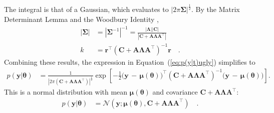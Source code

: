 \documentclass[modern]{rnaastex}
\renewcommand{\eqref}[1]{\ref{eq:#1}}
\newcommand{\Eq}[1]{Equation~(\eqref{#1})}
\newcommand{\eq}[1]{\Eq{#1}}
\newcommand{\eqlabel}[1]{\label{eq:#1}}
\newcommand{\bvec}[1]{{\ensuremath{\boldsymbol{#1}}}}
\newcommand{\Normal}{\ensuremath{\mathcal{N}}}
\newcommand{\mA}{\ensuremath{\bvec{A}}}
\newcommand{\mC}{\ensuremath{\bvec{C}}}
\newcommand{\mS}{\ensuremath{\bvec{\Sigma}}}
\newcommand{\mL}{\ensuremath{\bvec{\Lambda}}}
\newcommand{\vy}{\ensuremath{\bvec{y}}}
\newcommand{\vt}{\ensuremath{\bvec{\theta}}}
\newcommand{\vm}{\ensuremath{\bvec{\mu}(\bvec{\theta})}}
\newcommand{\vre}{\ensuremath{\bvec{r}}}
\begin{document}
%
The integral is that of a Gaussian, which evaluates to
$|2\pi\bvec{\Sigma}|^\frac{1}{2}$.
By the Matrix Determinant Lemma and the Woodbury Identity
\citep[for example,][]{Woodbury:1950, Harville:1997},
%
\begin{align}
|\mS| &= {|\mS^{-1}|}^{-1} = \frac{|\mL| |\mC|}{|\mC + \mA \mL \mA^\top|} \nonumber \\
k &= \vre^\top \left( \mC + \mA \mL \mA^\top \right)^{-1} \vre \quad.
\end{align}
%
Combining these results, the expression in \eq{p(y|t)ugly} simplifies to
\begin{align}
\eqlabel{p(y|t)exp}
p(\vy | \vt) &= \frac{1}{
                |2\pi(\mC {+} \mA \mL \mA^\top)|^\frac{1}{2}}
                \exp \left[ {-}\frac{1}{2} \big( \vy\,{-}\,\vm \big)^\top
                            (\mC {+} \mA \mL \mA^\top)^{-1}
                            \big( \vy\,{-}\,\vm \big)
                     \right].
\end{align}
%
This is a normal distribution with mean $\vm$ and covariance
$\mC + \mA \mL \mA^\top$:
%
\begin{align}
\eqlabel{p(y|t)normal_app}
p(\vy | \vt) &= \Normal (\vy; \vm, \mC + \mA \mL \mA^\top) \quad.
\end{align}
\end{document}
